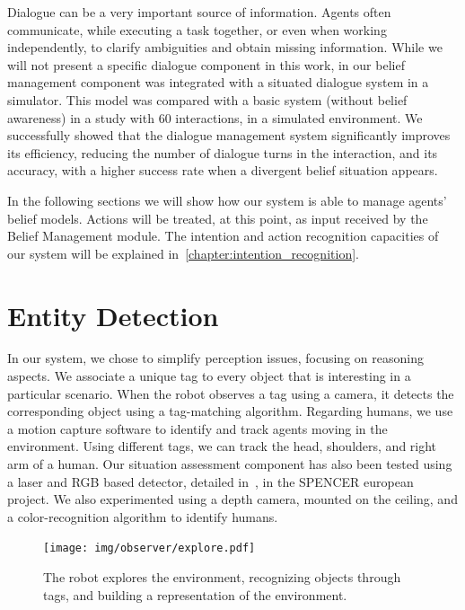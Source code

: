 Dialogue can be a very important source of information. Agents often communicate, while executing a task together, or even when working independently, to clarify ambiguities and obtain missing information. While we will not present a specific dialogue component in this work,  in \cite{Ferreira2015} our belief management component was integrated with a situated dialogue system in a simulator. This model was compared with a basic system (without belief awareness) in a study with 60 interactions, in a simulated environment. We successfully showed that the dialogue management system significantly improves its efficiency, reducing the number of dialogue turns in the interaction, and its accuracy, with a higher success rate when a divergent belief situation appears.

In the following sections we will show how our system is able to manage agents' belief models. Actions will be treated, at this point, as input received by the Belief Management module. The intention and action recognition capacities of our system will be explained in~\ref{chapter:intention_recognition}. 

\section{Entity Detection}
\label{sec:belief_management-entity_detection}
In our system, we chose to simplify perception issues, focusing on reasoning aspects. We associate a unique tag to every object that is interesting in a particular scenario. When the robot observes a tag using a camera, it detects the corresponding object using a tag-matching algorithm.
Regarding humans, we use a motion capture software to identify and track agents moving in the environment. Using different tags, we can track the head, shoulders, and right arm of a human. Our situation assessment component has also been tested using a laser and RGB based detector, detailed in~\cite{lindermulti}, in the SPENCER european project. We also experimented using a depth camera, mounted on the ceiling, and a color-recognition algorithm to identify humans. 

 \begin{figure}[ht!]
	\centering
	\texttt{[image: img/observer/explore.pdf]}
	\caption[The robot builds a representation of the environment]{The robot explores the environment, recognizing objects through tags, and building a representation of the environment.}
	\label{fig:belief_management-explore}
\end{figure}

